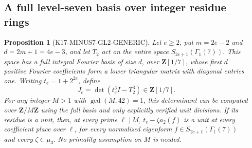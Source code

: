 \documentclass[11pt,a4paper]{article}
\newtheorem{proposition}[theorem]{Proposition}
\theoremstyle{definition}
\begin{document}
\subsection{A full level-seven basis over integer residue rings}
\label{sec:gl2-minus7-generic}

\begin{proposition}[K17-MINUS7-GL2-GENERIC]
\label{prop:minus7-gl2-generic}
Let \(e\ge2\), put \(m=2e-2\) and \(d=2m+1=4e-3\), and let
\(T_2\) act on the entire space \(S_{2e+1}(\Gamma_1(7))\).
This space has a full integral Fourier basis of size \(d\), over
\(\mathbf Z[1/7]\), whose first \(d\) positive Fourier coefficients
form a lower triangular matrix with diagonal entries one.
Writing \(t_e=1+2^{2e}\), define
\[
 J_e=\det(t_e^3I-T_2^3)\in\mathbf Z[1/7].
 \tag{G7G.1}
\]
For any integer \(M>1\) with \(\gcd(M,42)=1\), this determinant
can be computed over \(\mathbf Z/M\mathbf Z\) using the full
basis and only explicitly verified unit divisions.
If its residue is a unit, then, at every prime \(\ell\mid M\),
\(t_e-\zeta a_2(f)\) is a unit at every coefficient place over
\(\ell\), for every normalized eigenform
\(f\in S_{2e+1}(\Gamma_1(7))\) and every \(\zeta\in\mu_3\).
No primality assumption on \(M\) is needed.
\end{proposition}
\end{document}
